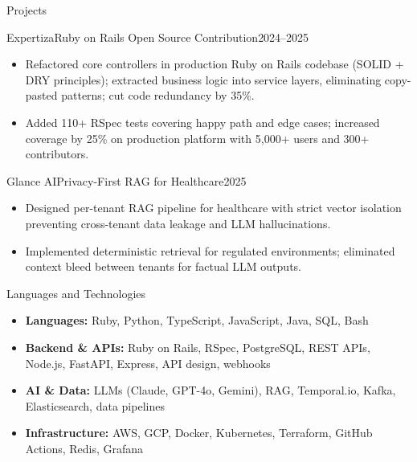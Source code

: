 \documentclass[]{mcdowellcv}
\begin{document}
\begin{cvsection}{Projects}
  \begin{cvsubsection}{Expertiza}{Ruby on Rails Open Source Contribution}{2024--2025}
    \begin{itemize}
      \item Refactored core controllers in production Ruby on Rails codebase (SOLID + DRY principles); extracted business logic into service layers, eliminating copy-pasted patterns; cut code redundancy by 35\%.
      \item Added 110+ RSpec tests covering happy path and edge cases; increased coverage by 25\% on production platform with 5,000+ users and 300+ contributors.
    \end{itemize}
    \vspace{-1.5pt}
  \end{cvsubsection}

  \begin{cvsubsection}{Glance AI}{Privacy-First RAG for Healthcare}{2025}
    \begin{itemize}
      \item Designed per-tenant RAG pipeline for healthcare with strict vector isolation preventing cross-tenant data leakage and LLM hallucinations.
      \item Implemented deterministic retrieval for regulated environments; eliminated context bleed between tenants for factual LLM outputs.
    \end{itemize}
    \vspace{-1.5pt}
  \end{cvsubsection}

\end{cvsection}

\begin{cvsection}{Languages and Technologies}
  \begin{cvsubsection}{}{}{}
    \begin{itemize}
      \item \textbf{Languages:} Ruby, Python, TypeScript, JavaScript, Java, SQL, Bash
      \item \textbf{Backend \& APIs:} Ruby on Rails, RSpec, PostgreSQL, REST APIs, Node.js, FastAPI, Express, API design, webhooks
      \item \textbf{AI \& Data:} LLMs (Claude, GPT-4o, Gemini), RAG, Temporal.io, Kafka, Elasticsearch, data pipelines
      \item \textbf{Infrastructure:} AWS, GCP, Docker, Kubernetes, Terraform, GitHub Actions, Redis, Grafana
    \end{itemize}
  \end{cvsubsection}
\end{cvsection}
\end{document}
